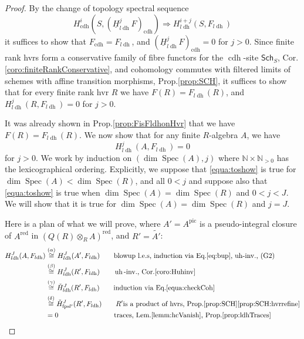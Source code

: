 \documentclass[10pt]{amsart}
\renewcommand{\implies}{\Rightarrow}
\theoremstyle{definition}
\newcommand{\NN}{\mathbb{N}}
\DeclareMathOperator{\Spec}{Spec}
\newcommand{\Sch}{\mathsf{Sch}}
\newcommand{\ulh}{\underline{H}}
\newcommand{\fpsl}{{\operatorname{fps\!}l'}}
\newcommand{\cdh}{{{\operatorname{cdh}}}}
\newcommand{\ldh}{{l{\operatorname{dh}}}}
\newcommand{\uh}{\operatorname{uh}}
\newcommand{\red}{{\operatorname{red}}}
\newcommand{\pic}{{\operatorname{pic}}}
\begin{document}
\begin{proof}
By the change of topology spectral sequence
\[ H^i_\cdh(S, (\ulh_\ldh^jF)_\cdh) \implies H^{i+j}_\ldh(S, F_\ldh) \]
it suffices to show that $F_\cdh = F_\ldh$, and $(\ulh_\ldh^jF)_{\cdh} = 0$ for $j > 0$. Since finite rank hvrs form a conservative family of fibre functors for the $\cdh$-site $\Sch_S$, Cor.\ref{coro:finiteRankConservative}, and cohomology commutes with filtered limits of schemes with affine transition morphisms, Prop.\ref{prop:SCH}, it suffices to show that for every finite rank hvr $R$ we have $F(R) = F_\ldh(R)$, and $H^j_\ldh(R, F_\ldh) = 0$ for $j > 0$.

It was already shown in Prop.\ref{prop:FisFldhonHvr} that we have $F(R) = F_\ldh(R)$. We now show that for any finite $R$-algebra $A$, we have \begin{equation} \label{equa:toshow}
H^j_\ldh(A, F_\ldh) = 0%
\end{equation}
for $j > 0$. We work by induction on $(\dim \Spec(A), j)$ where $\NN \times \NN_{>0}$ has the lexicographical ordering. Explicitly, we suppose that \eqref{equa:toshow} is true for $\dim \Spec(A) < \dim \Spec(R)$, and all $0 < j$ and suppose also that \eqref{equa:toshow} is true when $\dim \Spec(A) = \dim \Spec(R)$ and $0 < j < J$. We will show that it is true for $\dim \Spec(A) = \dim \Spec(R)$ and $j = J$.

Here is a plan of what we will prove, where $A' = A^\pic$ is a pseudo-integral closure of $A^\red$ in $(Q(R) \otimes_R A)^\red$, and $R' = \widetilde{A'}$:
\begin{align*}
H_\ldh^J(A, F_\ldh)
&\stackrel{(\alpha)}{\cong} H_\ldh^J(A', F_\ldh) \qquad \textrm{blowup l.e.s, induction via Eq.\eqref{eq:bup}, $\uh$-inv., (G2)} \\
&\stackrel{(\beta)}{\cong} H_\ldh^J(R', F_\ldh) \qquad \uh\textrm{-inv., Cor.\ref{coro:Huhinv}} \\
&\stackrel{(\gamma)}{\cong} \check{H}_\ldh^J(R', F_\ldh) \qquad \textrm{induction via Eq.\eqref{equa:checkCoh}} \\
&\stackrel{(\delta)}{\cong} \check{H}_\fpsl^J(R', F_\ldh) \qquad R' \textrm{is a product of hvrs, Prop.\ref{prop:SCH}\eqref{prop:SCH:hvrrefine}} \\
&= 0 \qquad \qquad \qquad \qquad \textrm{traces, Lem.\ref{lemm:hcVanish}, Prop.\ref{prop:ldhTraces}}
\end{align*}


\end{proof}
\end{document}
